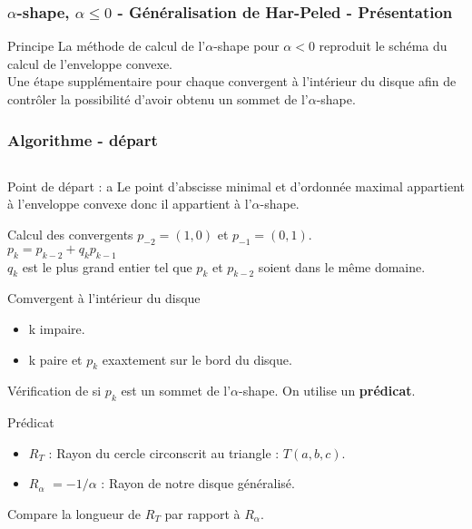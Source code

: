 \begin{frame}
\frametitle{$\alpha$-shape, $\alpha \leq 0$ - Généralisation de Har-Peled - Présentation}

\begin{block}{Principe}
  La méthode de calcul de l'$\alpha$-shape pour $\alpha <0$ reproduit le schéma du calcul de l’enveloppe convexe.\\ 
  Une étape supplémentaire pour chaque convergent à l'intérieur du disque afin de contrôler la possibilité d'avoir obtenu un sommet de l'$\alpha$-shape.

\end{block}

\end{frame}

\begin{frame}
\frametitle{Algorithme - départ}

\begin{columns}[t]
  \begin{column}{0.7\linewidth}
    {
      \begin{block}{Point de départ : a}
        Le point d'abscisse minimal et d'ordonnée maximal appartient à l'enveloppe convexe donc il appartient à l'$\alpha$-shape.\\
      \end{block}
    }
    {  
      \begin{block}{Calcul des convergents}
        $p_{-2} = (1,0)$ et $p_{-1} = (0,1)$.\\
        $p_{k} = p_{k-2} + q_k p_{k-1}$\\
        $q_k$ est le plus grand entier tel que $p_{k}$ et $p_{k-2}$ soient dans le même domaine.
      \end{block}
    }
    {
      \begin{block}{Comvergent à l'intérieur du disque}
        \begin{itemize}
          \item k impaire.
          \item k paire et $p_k$ exaxtement sur le bord du disque.
        \end{itemize}
        Vérification de si $p_k$ est un sommet de l'$\alpha$-shape.
        On utilise un \textbf{prédicat}.
      \end{block}
    }
    {
      \begin{block}{Prédicat}
      \begin{itemize}
        \item \textbf{$R_T$} : Rayon du cercle circonscrit au triangle : $T(a, b, c)$.
        \item \textbf{$R_{\alpha}$} $= -1/\alpha$ : Rayon de notre disque généralisé.
      \end{itemize}      
        Compare la longueur de \textbf{$R_T$} par rapport à \textbf{$R_{\alpha}$}.\\
      \end{block}
      
}
\end{column}
\end{columns}
\end{frame}

